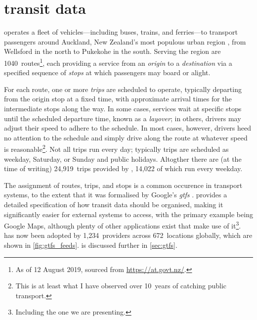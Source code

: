 \chapter{\Rt{} transit data}
\label{cha:data}



\AT{} operates a fleet of vehicles---including buses, trains, and ferries---to transport passengers around Auckland, New Zealand's most populous urban region \citep{StatsNZ_2019}, from Wellsford in the north to Pukekohe in the south. Serving the region are 1040~routes\footnote{As of 12 August 2019, sourced from \url{https://at.govt.nz/}.}, each providing a service from an \emph{origin} to a \emph{destination} via a specified sequence of \emph{stops} at which passengers may board or alight.


For each route, one or more \emph{trips} are scheduled to operate, typically departing from the origin stop at a fixed time, with approximate arrival times for the intermediate stops along the way. In some cases, services wait at specific stops until the scheduled departure time, known as a \emph{layover}; in others, drivers may adjust their speed to adhere to the schedule. In most cases, however, drivers heed no attention to the schedule and simply drive along the route at whatever speed is reasonable\footnote{This is at least what I have observed over 10~years of catching public transport.}. Not all trips run every day; typically trips are scheduled as weekday, Saturday, or Sunday and public holidays. Altogther there are (at the time of writing) 24,919~trips provided by \AT{}, 14,022 of which run every weekday.


The assignment of routes, trips, and stops is a common occurence in transport systems, to the extent that it was formalised by Google's \emph{\acrfull{gtfs}} \citep {GoogleDevelopers_2006}. \GTFS{} provides a detailed specification of how transit data should be organised, making it significantly easier for external systems to access, with the primary example being Google Maps, although plenty of other applications exist that make use of it\footnote{Including the one we are presenting.}. \GTFS{} has now been adopted by 1,234~providers across 672~locations globally, which are shown in \cref{fig:gtfs_feeds}. \GTFS{} is discussed further in \cref{sec:gtfs}.

